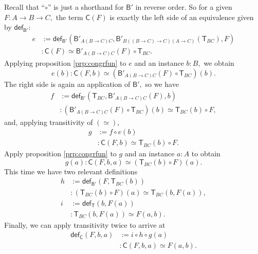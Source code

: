 \documentclass[a4paper]{article}
\theoremstyle{definition}
\theoremstyle{remark}
\renewcommand{\equiv}{\simeq}
\newcommand{\nm}{\mathsf}
\newcommand{\fndef}[1]{\nm{def}_{#1}}
\newcommand{\combinator}{\nm}
\newcommand{\appFun}{\combinator{T}}
\newcommand{\compFun}{\combinator{B'}}
\newcommand{\swapFun}{\combinator{C}}
\begin{document}
Recall that ``$\circ$'' is just a shorthand for $\compFun$ in reverse order. So for a given
$F : A \to B \to C,$ the term $\swapFun(F)$ is exactly the left side of an equivalence given
by $\fndef{\compFun}$:
\begin{align*}
  e &:= \fndef{\compFun}(\compFun_{A(B{\to}C)C},\compFun_{B((B{\to}C){\to}C)(A{\to}C)}(\appFun_{BC}),F)\\
    &: \swapFun(F) \equiv \compFun_{A(B{\to}C)C}(F) \circ \appFun_{BC}.
\end{align*}
Applying proposition \ref{prp:congrfun} to $e$ and an instance $b : B,$ we obtain
\[e(b) : \swapFun(F,b) \equiv (\compFun_{A(B{\to}C)C}(F) \circ \appFun_{BC})(b).\]
The right side is again an application of $\compFun,$ so we have
\begin{align*}
  f &:= \fndef{\compFun}(\appFun_{BC},\compFun_{A(B{\to}C)C}(F),b)\\
    &: (\compFun_{A(B{\to}C)C}(F) \circ \appFun_{BC})(b) \equiv \appFun_{BC}(b) \circ F,
\end{align*}
and, applying transitivity of $(\equiv),$
\begin{align*}
  g &:= f \circ e(b)\\
    &: \swapFun(F,b) \equiv \appFun_{BC}(b) \circ F.
\end{align*}
Apply proposition \ref{prp:congrfun} to $g$ and an instance $a : A$ to obtain
\[g(a) : \swapFun(F,b,a) \equiv (\appFun_{BC}(b) \circ F)(a).\]
This time we have two relevant definitions
\begin{align*}
  h &:= \fndef{\compFun}(F,\appFun_{BC}(b))\\
    &: (\appFun_{BC}(b) \circ F)(a) \equiv \appFun_{BC}(b,F(a)),\\[1ex]
  i &:= \fndef{\appFun}(b,F(a))\\
    &: \appFun_{BC}(b,F(a)) \equiv F(a,b).
\end{align*}
Finally, we can apply transitivity twice to arrive at
\begin{align*}
  \fndef{\swapFun}(F,b,a) &:= i \circ h \circ g(a)\\
                          &: \swapFun(F,b,a) \equiv F(a,b).
\end{align*}
\end{document}
